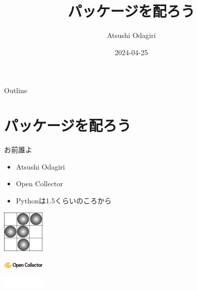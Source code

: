 \documentclass[presentation]{beamer}
\author{Atsushi Odagiri}
\date{2024-04-25}
\title{パッケージを配ろう}
\begin{document}
\maketitle
\begin{frame}{Outline}
\tableofcontents
\end{frame}

\section{パッケージを配ろう}
\label{sec:org76ff320}
\begin{frame}[label={sec:org693fcb1}]{お前誰よ}
\begin{block}{}
\begin{itemize}
\item Atsushi Odagiri
\item Open Collector
\item Pythonは1.5くらいのころから
\end{itemize}
\end{block}

\begin{block}{}
\begin{center}
\includegraphics[width=2cm]{./r-penta512.png}
\end{center}

\begin{center}
\includegraphics[width=2cm]{./oc-logo.png}
\end{center}
\begin{center}
\includegraphics[width=2cm]{./logo-w.png}
\end{center}
\end{block}
\end{frame}
\end{document}
